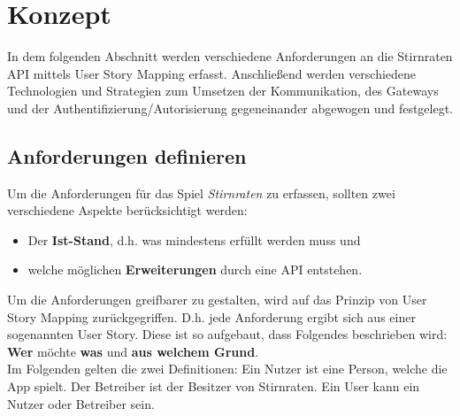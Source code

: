 \section{Konzept}
In dem folgenden Abschnitt werden verschiedene Anforderungen an die Stirnraten API mittels User Story Mapping erfasst. Anschließend werden verschiedene Technologien und Strategien zum Umsetzen der Kommunikation, des Gateways und der Authentifizierung/Autorisierung gegeneinander abgewogen und festgelegt.

\subsection{Anforderungen definieren}
Um die Anforderungen für das Spiel \textit{Stirnraten} zu erfassen, sollten zwei verschiedene Aspekte berücksichtigt werden: 

\begin{itemize}
	\item Der \textbf{Ist-Stand}, d.h. was mindestens erfüllt werden muss und 
	\item welche möglichen \textbf{Erweiterungen} durch eine API entstehen.
\end{itemize}

Um die Anforderungen greifbarer zu gestalten, wird auf das Prinzip von User Story Mapping zurückgegriffen. D.h. jede Anforderung ergibt sich aus einer sogenannten User Story. Diese ist so aufgebaut, dass Folgendes beschrieben wird: \textbf{Wer} möchte \textbf{was} und \textbf{aus welchem Grund}.\cite{UserStoryMapping}\\

Im Folgenden gelten die zwei Definitionen: Ein Nutzer ist eine Person, welche die App spielt. Der Betreiber ist der Besitzer von Stirnraten. Ein User kann ein Nutzer oder Betreiber sein. \\


